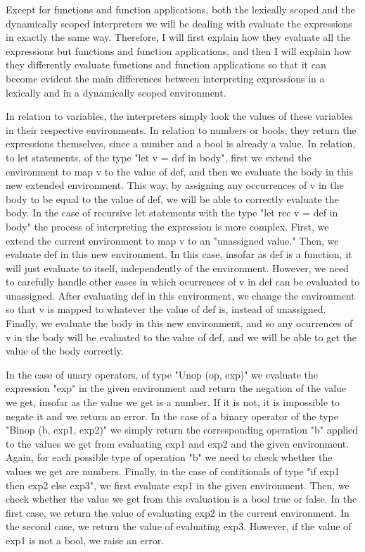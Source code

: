 \documentclass[a4paper]{article}
\begin{document}
Except for functions and function applications, both the lexically scoped and the dynamically scoped interpreters we will be dealing with evaluate the expressions in exactly the same way. Therefore, I will first explain how they evaluate all the expressions but functions and function applications, and then I will explain how they differently evaluate functions and function applications so that it can become evident the main differences between interpreting expressions in a lexically and in a dynamically scoped environment.

In relation to variables, the interpreters simply look the values of these variables in their respective environments. In relation to numbers or bools, they return the expressions themselves, since a number and a bool is already a value. In relation, to let statements, of the type "let v = def in body", first we extend the environment to map v to the value of def, and then we evaluate the body in this new extended environment. This way, by assigning any occurrences of v in the body to be equal to the value of def, we will be able to correctly evaluate the body. In the case of recursive let statements with the type "let rec v = def in body" the process of interpreting the expression is more complex. First, we extend the current environment to map v to an "unassigned value." Then, we evaluate def in this new environment. In this case, insofar as def is a function, it will just evaluate to itself, independently of the environment. However, we need to carefully handle other cases in which ocurrences of v in def can be evaluated to unassigned. After evaluating def in this environment, we change the environment so that v is mapped to whatever the value of def is, instead of unassigned. Finally, we evaluate the body in this new environment, and so any ocurrences of v in the body will be evaluated to the value of def, and we will be able to get the value of the body correctly.

	In the case of unary operators, of type  "Unop (op, exp)" we evaluate the expression "exp" in the given environment and return the negation of the value we get, insofar as the value we get is a number. If it is not, it is impossible to negate it and we return an error. In the case of a binary operator of the type "Binop (b, exp1, exp2)" we simply return the corresponding operation "b" applied to the values we get from evaluating exp1 and exp2 and the given environment. Again, for each possible type of operation "b" we need to check whether the values we get are numbers. Finally, in the case of contitionals of type "if exp1 then exp2 else exp3", we first evaluate exp1 in the given environment. Then, we check whether the value we get from this evaluation is a bool true or false. In the first case, we return the value of evaluating exp2 in the current environment. In the second case, we return the value of evaluating exp3. However, if the value of exp1 is not a bool, we raise an error.
    
\end{document}
